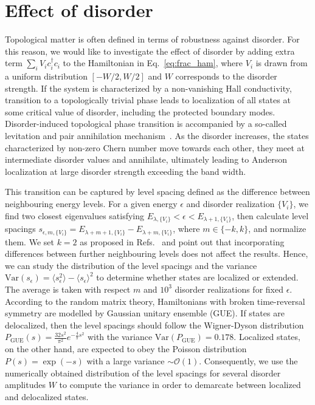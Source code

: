 {\section{Effect of disorder}
Topological matter is often defined in terms of robustness against disorder. For this reason, we would like to investigate the effect of disorder by adding extra term $\sum_i V_i c_i^{\dagger} c_i$ to the Hamiltonian in Eq.~\eqref{eq:frac_ham}, where $V_i$ is drawn from a uniform distribution $\left[ -W/2, W/2 \right]$ and $W$ corresponds to the disorder strength. If the system is characterized by a non-vanishing Hall conductivity, transition to a topologically trivial phase leads to localization of all states at some critical value of disorder, including the protected boundary modes. Disorder-induced topological phase transition is accompanied by a so-called levitation and pair annihilation mechanism~\cite{PhysRevLett.52.2304, onoda}. As the disorder increases, the states characterized by non-zero Chern number move towards each other, they meet at intermediate disorder values and annihilate, ultimately leading to Anderson localization at large disorder strength exceeding the band width.

This transition can be captured by level spacing defined as the difference between neighbouring energy levels. For a given energy $\epsilon$ and disorder realization $\{V_i\}$, we find two closest eigenvalues satisfying $ E_{\lambda, \{V_i\}} < \epsilon < E_{\lambda + 1, \{V_i\}}$, then calculate level spacings $s_{\epsilon, m, \{V_i\}} = E_{\lambda + m + 1, \{V_i\}} - E_{\lambda + m, \{V_i\}}$, where $m \in \lbrace -k, k \rbrace$, and normalize them. We set $k = 2$ as proposed in Refs.~\cite{2010:ProdanDisordCI, 2011:Prodan} and point out that incorporating differences between further neighbouring levels does not affect the results. Hence, we can study the distribution of the level spacings and the variance $\mathrm{Var} (s_{\epsilon}) = \langle s_{\epsilon}^2 \rangle - \langle s_{\epsilon} \rangle^2$ to determine whether states are localized or extended. The average is taken with respect $m$ and $10^3$ disorder realizations for fixed $\epsilon$. According to the random matrix theory, Hamiltonians with broken time-reversal symmetry are modelled by Gaussian unitary ensemble (GUE). If states are delocalized, then the level spacings should follow the Wigner-Dyson distribution $P_{\mathrm{GUE}} (s) = \frac{32 s^2}{\pi^2} e^{-\frac{4}{\pi} s^2}$ with the variance $\mathrm{Var}(P_{\mathrm{GUE}}) = 0.178$. Localized states, on the other hand, are expected to obey the Poisson distribution $P (s) = \exp (-s)$ with a large variance $ \sim \mathcal{O}(1)$. Consequently, we use the numerically obtained distribution of the level spacings for several disorder amplitudes $W$ to compute the variance in order to demarcate between localized and delocalized states.

}

